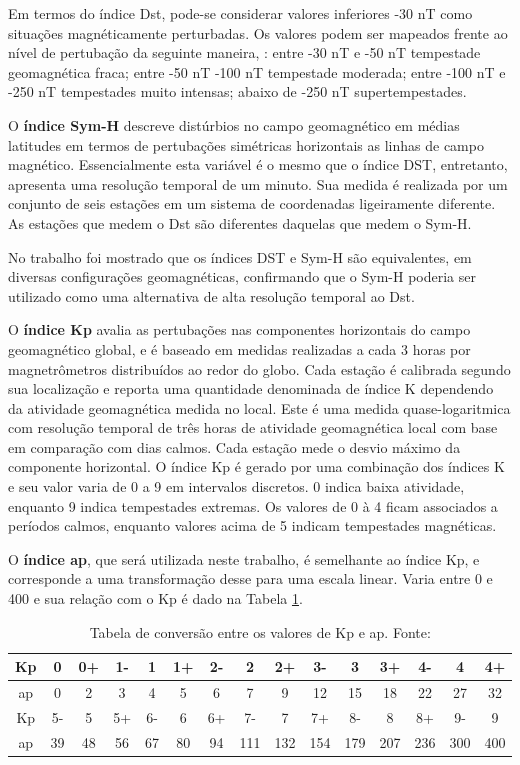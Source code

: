Em termos do índice Dst, pode-se considerar valores inferiores -30 nT como situações magnéticamente perturbadas. Os valores podem ser mapeados frente ao nível de pertubação da seguinte maneira, \cite{GONZALEZ:1994}: entre -30 nT e -50 nT tempestade geomagnética fraca; entre -50 nT -100 nT tempestade moderada; entre -100 nT e -250 nT tempestades muito intensas; abaixo de -250 nT supertempestades.

O {\bf índice Sym-H} descreve distúrbios no campo geomagnético em médias latitudes em termos de pertubações simétricas horizontais as linhas de campo magnético. Essencialmente esta variável é o mesmo que o índice DST, entretanto, apresenta uma resolução temporal de um minuto. Sua medida é realizada por um conjunto de seis estações em um sistema de coordenadas ligeiramente diferente. As estações que medem o Dst são diferentes daquelas que medem o Sym-H.

No trabalho \cite{WANLISS:2006} foi mostrado que os índices DST e Sym-H são equivalentes, em diversas configurações geomagnéticas, confirmando que o Sym-H poderia ser utilizado como uma alternativa de alta resolução temporal ao Dst.

O {\bf índice Kp} avalia as pertubações nas componentes horizontais do campo geomagnético global, e é baseado em medidas realizadas a cada 3 horas por magnetrômetros distribuídos ao redor do globo. Cada estação é calibrada segundo sua localização e reporta uma quantidade denominada de índice K dependendo da atividade geomagnética medida no local. Este é uma medida quase-logaritmica com resolução temporal de três horas de atividade geomagnética local com base em comparação com dias calmos. Cada estação mede o desvio máximo da componente horizontal. O índice Kp é gerado por uma combinação dos índices K e seu valor varia de 0 a 9 em intervalos discretos. 0 indica baixa atividade, enquanto 9 indica tempestades extremas. Os valores de 0 à 4 ficam associados a períodos calmos, enquanto valores acima de 5 indicam tempestades magnéticas.

O {\bf índice ap}, que será utilizada neste trabalho, é semelhante ao índice Kp, e corresponde a uma transformação desse para uma escala linear. Varia entre 0 e 400 e sua relação com o Kp é dado na Tabela \ref{tab:kptoap}.

\begin{table}[hhh]
\begin{tabular}{|c|c|c|c|c|c|c|c|c|c|c|c|c|c|c|} \hline
Kp & 0  & 0+ & 1- & 1  & 1+ & 2- & 2   & 2+  & 3-  & 3   & 3+  & 4-  & 4   & 4+  \\ \hline
ap & 0  & 2  & 3  & 4  & 5  & 6  & 7   & 9   & 12  & 15  & 18  & 22  & 27  & 32  \\ \hline
Kp & 5- & 5  & 5+ & 6- & 6  & 6+ & 7-  & 7   & 7+  & 8-  & 8   & 8+  & 9-  & 9   \\ \hline
ap & 39 & 48 & 56 & 67 & 80 & 94 & 111 & 132 & 154 & 179 & 207 & 236 & 300 & 400 \\ \hline
\end{tabular}
\caption{Tabela de conversão entre os valores de Kp e ap. Fonte: \cite{KP:2019}}
\label{tab:kptoap}
\end{table}

